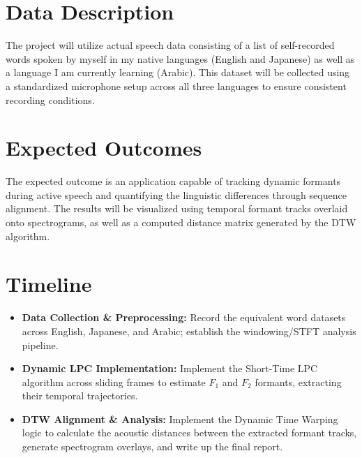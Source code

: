 \documentclass[11pt, letterpaper]{article}
\begin{document}
\section{Data Description}
The project will utilize actual speech data consisting of a list of self-recorded words spoken by myself in my native languages (English and Japanese) as well as a language I am currently learning (Arabic). 
This dataset will be collected using a standardized microphone setup across all three languages to ensure consistent recording conditions. 

\section{Expected Outcomes}
The expected outcome is an application capable of tracking dynamic formants during active speech and quantifying the linguistic differences through sequence alignment. 
The results will be visualized using temporal formant tracks overlaid onto spectrograms, as well as a computed distance matrix generated by the DTW algorithm. 

\section{Timeline}
\begin{itemize}[noitemsep,topsep=0pt]
    \item \textbf{Data Collection \& Preprocessing:} Record the equivalent word datasets across English, Japanese, and Arabic; establish the windowing/STFT analysis pipeline.
    \item \textbf{Dynamic LPC Implementation:} Implement the Short-Time LPC algorithm across sliding frames to estimate $F_1$ and $F_2$ formants, extracting their temporal trajectories.
    \item \textbf{DTW Alignment \& Analysis:} Implement the Dynamic Time Warping logic to calculate the acoustic distances between the extracted formant tracks, generate spectrogram overlays, and write up the final report.
\end{itemize}
\end{document}
